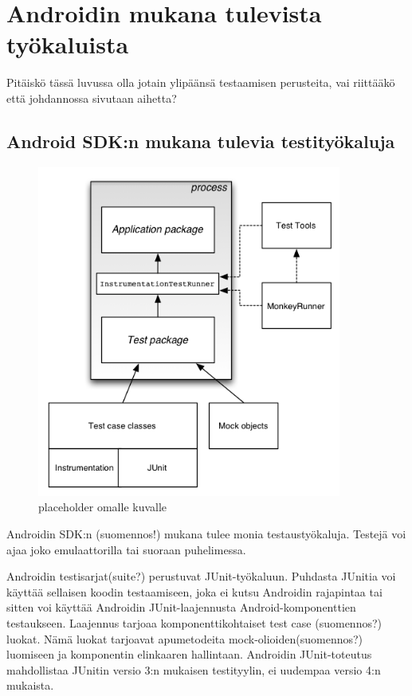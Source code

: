 \section{Androidin mukana tulevista työkaluista}

Pitäiskö tässä luvussa olla jotain ylipäänsä testaamisen perusteita, vai riittääkö että johdannossa sivutaan aihetta?

\subsection{Android SDK:n mukana tulevia testityökaluja}

\begin{figure}[htb]
\includegraphics[width=100mm]{test_framework.png}
\caption{placeholder omalle kuvalle} \label{test_framework}
\end{figure}

Androidin SDK:n (suomennos!) mukana tulee monia testaustyökaluja. Testejä voi ajaa joko emulaattorilla tai suoraan puhelimessa.

Androidin testisarjat(suite?) perustuvat JUnit-työkaluun. Puhdasta JUnitia voi käyttää sellaisen koodin testaamiseen, joka ei kutsu Androidin rajapintaa tai sitten voi käyttää Androidin JUnit-laajennusta Android-komponenttien testaukseen. Laajennus tarjoaa komponenttikohtaiset test case (suomennos?) luokat. Nämä luokat tarjoavat apumetodeita mock-olioiden(suomennos?) luomiseen ja komponentin elinkaaren hallintaan. Androidin JUnit-toteutus mahdollistaa JUnitin versio 3:n mukaisen testityylin, ei uudempaa versio 4:n mukaista.


